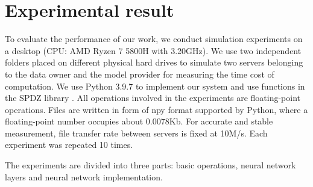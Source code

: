 \documentclass[letterpaper]{article} %
\begin{document}
    \section{Experimental result}
    To evaluate the performance of our work, we conduct simulation experiments on a desktop (CPU: AMD Ryzen 7 5800H with 3.20GHz).
    We use two independent folders placed on different physical hard drives to simulate two servers belonging to the
    data owner and the model provider for measuring the time cost of computation.
    We use Python 3.9.7 to implement our system and use functions in the SPDZ library \cite{SPDZ}.
    All operations involved in the experiments are floating-point operations.
    Files are written in form of npy format supported by Python, where a floating-point number occupies about 0.0078Kb.
    For accurate and stable measurement, file transfer rate between servers is fixed at 10M/s.
    Each experiment was repeated 10 times.

    The experiments are divided into three parts: basic operations, neural network layers and neural network implementation.
\end{document}
